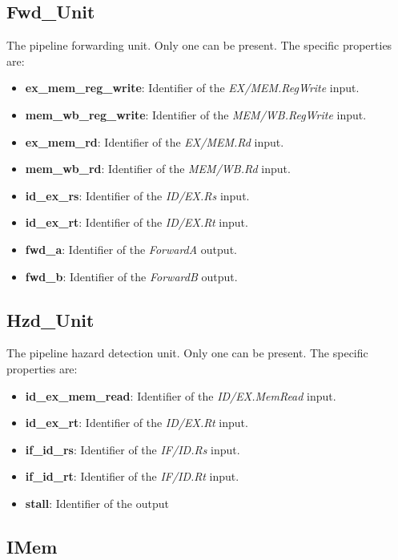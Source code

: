 \documentclass[11pt,a4paper,twoside,titlepage]{report}
\begin{document}
\subsection{Fwd\_Unit}

The pipeline forwarding unit. Only one can be present.
The specific properties are:
\begin{itemize}
	\item \textbf{ex\_mem\_reg\_write}: Identifier of the \textit{EX/MEM.RegWrite} input.
	\item \textbf{mem\_wb\_reg\_write}: Identifier of the \textit{MEM/WB.RegWrite} input.
	\item \textbf{ex\_mem\_rd}: Identifier of the \textit{EX/MEM.Rd} input.
	\item \textbf{mem\_wb\_rd}: Identifier of the \textit{MEM/WB.Rd} input.
	\item \textbf{id\_ex\_rs}: Identifier of the \textit{ID/EX.Rs} input.
	\item \textbf{id\_ex\_rt}: Identifier of the \textit{ID/EX.Rt} input.
	\item \textbf{fwd\_a}: Identifier of the \textit{ForwardA} output.
	\item \textbf{fwd\_b}: Identifier of the \textit{ForwardB} output.
\end{itemize}

\subsection{Hzd\_Unit}

The pipeline hazard detection unit. Only one can be present.
The specific properties are:
\begin{itemize}
	\item \textbf{id\_ex\_mem\_read}: Identifier of the \textit{ID/EX.MemRead} input.
	\item \textbf{id\_ex\_rt}: Identifier of the \textit{ID/EX.Rt} input.
	\item \textbf{if\_id\_rs}: Identifier of the \textit{IF/ID.Rs} input.
	\item \textbf{if\_id\_rt}: Identifier of the \textit{IF/ID.Rt} input.
	\item \textbf{stall}: Identifier of the output
\end{itemize}

\subsection{IMem}
\end{document}
